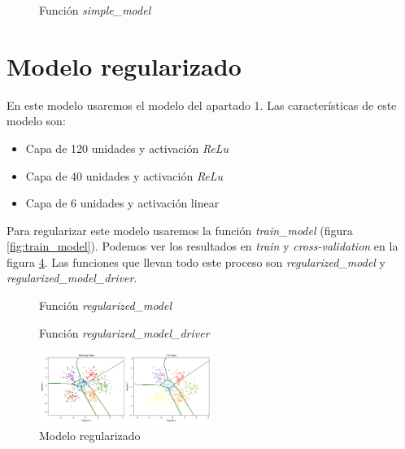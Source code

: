 \documentclass[6pt]{../../shared/AiTex}
\begin{document}
\begin{figure}[H]
    \centering
    
    \caption{Función \textit{simple\_model}}
    \label{fig:simple_model}
\end{figure}



\section{Modelo regularizado}

En este modelo usaremos el modelo del apartado 1. Las características de este modelo son:
\begin{itemize}
    \item Capa de 120 unidades y activación \textit{ReLu}
    \item Capa de 40 unidades y activación \textit{ReLu}
    \item Capa de 6 unidades y activación linear
\end{itemize}

Para regularizar este modelo usaremos la función \textit{train\_model} (figura \ref{fig:train_model}). Podemos ver los resultados en \textit{train} y \textit{cross-validation} en la figura \ref{fig:regularized_results}. Las funciones que llevan todo este proceso son \textit{regularized\_model} y \textit{regularized\_model\_driver}.


\begin{figure}[H]
    \centering
    
    \caption{Función \textit{regularized\_model}}
    \label{fig:regularized_model}
\end{figure}

\begin{figure}[H]
    \centering
    
    \caption{Función \textit{regularized\_model\_driver}}
    \label{fig:regularized_model_driver}
\end{figure}

\begin{figure}[H]
    \centering
    \includegraphics[width=0.5\textwidth]{./images/decision_boundary_regularized.png}
    \caption{Modelo regularizado}
    \label{fig:regularized_results}
\end{figure}
\end{document}
